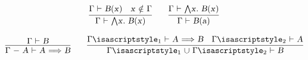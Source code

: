 \begin{isabellebody}
\begin{isamarkuptext}
  \[
  \infer{\isa{{\isaliteral{22}{\isachardoublequote}}{\isaliteral{5C3C47616D6D613E}{\isasymGamma}}\ {\isaliteral{5C3C7475726E7374696C653E}{\isasymturnstile}}\ {\isaliteral{5C3C416E643E}{\isasymAnd}}x{\isaliteral{2E}{\isachardot}}\ B{\isaliteral{28}{\isacharparenleft}}x{\isaliteral{29}{\isacharparenright}}{\isaliteral{22}{\isachardoublequote}}}}{\isa{{\isaliteral{22}{\isachardoublequote}}{\isaliteral{5C3C47616D6D613E}{\isasymGamma}}\ {\isaliteral{5C3C7475726E7374696C653E}{\isasymturnstile}}\ B{\isaliteral{28}{\isacharparenleft}}x{\isaliteral{29}{\isacharparenright}}{\isaliteral{22}{\isachardoublequote}}} & \isa{{\isaliteral{22}{\isachardoublequote}}x\ {\isaliteral{5C3C6E6F74696E3E}{\isasymnotin}}\ {\isaliteral{5C3C47616D6D613E}{\isasymGamma}}{\isaliteral{22}{\isachardoublequote}}}}
  \qquad
  \infer{\isa{{\isaliteral{22}{\isachardoublequote}}{\isaliteral{5C3C47616D6D613E}{\isasymGamma}}\ {\isaliteral{5C3C7475726E7374696C653E}{\isasymturnstile}}\ B{\isaliteral{28}{\isacharparenleft}}a{\isaliteral{29}{\isacharparenright}}{\isaliteral{22}{\isachardoublequote}}}}{\isa{{\isaliteral{22}{\isachardoublequote}}{\isaliteral{5C3C47616D6D613E}{\isasymGamma}}\ {\isaliteral{5C3C7475726E7374696C653E}{\isasymturnstile}}\ {\isaliteral{5C3C416E643E}{\isasymAnd}}x{\isaliteral{2E}{\isachardot}}\ B{\isaliteral{28}{\isacharparenleft}}x{\isaliteral{29}{\isacharparenright}}{\isaliteral{22}{\isachardoublequote}}}}
  \]

  \[
  \infer{\isa{{\isaliteral{22}{\isachardoublequote}}{\isaliteral{5C3C47616D6D613E}{\isasymGamma}}\ {\isaliteral{2D}{\isacharminus}}\ A\ {\isaliteral{5C3C7475726E7374696C653E}{\isasymturnstile}}\ A\ {\isaliteral{5C3C4C6F6E6772696768746172726F773E}{\isasymLongrightarrow}}\ B{\isaliteral{22}{\isachardoublequote}}}}{\isa{{\isaliteral{22}{\isachardoublequote}}{\isaliteral{5C3C47616D6D613E}{\isasymGamma}}\ {\isaliteral{5C3C7475726E7374696C653E}{\isasymturnstile}}\ B{\isaliteral{22}{\isachardoublequote}}}}
  \qquad
  \infer{\isa{{\isaliteral{22}{\isachardoublequote}}{\isaliteral{5C3C47616D6D613E}{\isasymGamma}}\isaliteral{5C3C5E7375623E}{}\isactrlsub {\isadigit{1}}\ {\isaliteral{5C3C756E696F6E3E}{\isasymunion}}\ {\isaliteral{5C3C47616D6D613E}{\isasymGamma}}\isaliteral{5C3C5E7375623E}{}\isactrlsub {\isadigit{2}}\ {\isaliteral{5C3C7475726E7374696C653E}{\isasymturnstile}}\ B{\isaliteral{22}{\isachardoublequote}}}}{\isa{{\isaliteral{22}{\isachardoublequote}}{\isaliteral{5C3C47616D6D613E}{\isasymGamma}}\isaliteral{5C3C5E7375623E}{}\isactrlsub {\isadigit{1}}\ {\isaliteral{5C3C7475726E7374696C653E}{\isasymturnstile}}\ A\ {\isaliteral{5C3C4C6F6E6772696768746172726F773E}{\isasymLongrightarrow}}\ B{\isaliteral{22}{\isachardoublequote}}} & \isa{{\isaliteral{22}{\isachardoublequote}}{\isaliteral{5C3C47616D6D613E}{\isasymGamma}}\isaliteral{5C3C5E7375623E}{}\isactrlsub {\isadigit{2}}\ {\isaliteral{5C3C7475726E7374696C653E}{\isasymturnstile}}\ A{\isaliteral{22}{\isachardoublequote}}}}
  \]


\end{isamarkuptext}
\end{isabellebody}
